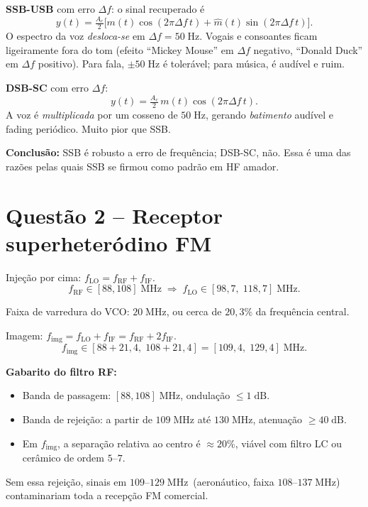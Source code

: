 \documentclass[11pt,a4paper]{article}
\begin{document}
\begin{resolucao}

\textbf{SSB-USB} com erro $\Delta f$: o sinal recuperado é
\[
  y(t) = \tfrac{A_c}{2}\big[m(t)\cos(2\pi\Delta f\,t) + \hat m(t)\sin(2\pi\Delta f\,t)\big].
\]
O espectro da voz \emph{desloca-se} em $\Delta f = 50\;\text{Hz}$. Vogais e consoantes ficam ligeiramente fora do tom (efeito ``Mickey Mouse'' em $\Delta f$ negativo, ``Donald Duck'' em $\Delta f$ positivo). Para fala, $\pm 50\;\text{Hz}$ é tolerável; para música, é audível e ruim.

\textbf{DSB-SC} com erro $\Delta f$:
\[
  y(t) = \tfrac{A_c}{2}\,m(t)\cos(2\pi\Delta f\,t).
\]
A voz é \emph{multiplicada} por um cosseno de $50\;\text{Hz}$, gerando \emph{batimento} audível e fading periódico. Muito pior que SSB.

\textbf{Conclusão:} SSB é robusto a erro de frequência; DSB-SC, não. Essa é uma das razões pelas quais SSB se firmou como padrão em HF amador.
\end{resolucao}

\section*{Questão 2 -- Receptor superheteródino FM}

\begin{resolucao}

Injeção por cima: $f_{\text{LO}} = f_{\text{RF}} + f_{\text{IF}}$.
\[
  f_{\text{RF}} \in [88, 108]\;\text{MHz} \;\Rightarrow\; f_{\text{LO}} \in [98{,}7,\;118{,}7]\;\text{MHz}.
\]

Faixa de varredura do VCO: $20\;\text{MHz}$, ou cerca de $20{,}3\%$ da frequência central.
\end{resolucao}

\begin{resolucao}

Imagem: $f_{\text{img}} = f_{\text{LO}} + f_{\text{IF}} = f_{\text{RF}} + 2 f_{\text{IF}}$.
\[
  f_{\text{img}} \in [88 + 21{,}4,\;108 + 21{,}4] = [109{,}4,\;129{,}4]\;\text{MHz}.
\]

\textbf{Gabarito do filtro RF:}
\begin{itemize}\itemsep0pt
  \item Banda de passagem: $[88, 108]\;\text{MHz}$, ondulação $\le 1\;\text{dB}$.
  \item Banda de rejeição: a partir de $109\;\text{MHz}$ até $130\;\text{MHz}$, atenuação $\ge 40\;\text{dB}$.
  \item Em $f_{\text{img}}$, a separação relativa ao centro é $\approx 20\%$, viável com filtro LC ou cerâmico de ordem $5$--$7$.
\end{itemize}

Sem essa rejeição, sinais em $109$--$129\;\text{MHz}$ \,(aeronáutico, faixa $108$--$137\;\text{MHz}$)\, contaminariam toda a recepção FM comercial.
\end{resolucao}
\end{document}
